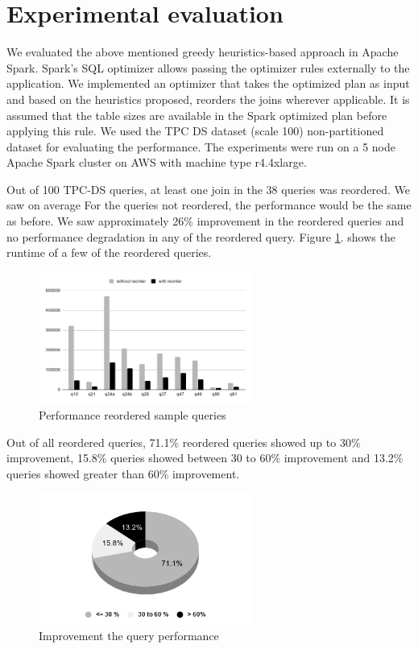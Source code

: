 \section{Experimental evaluation}\label{sec:exp-evaluation}
We evaluated the above mentioned greedy heuristics-based approach in Apache Spark. Spark's SQL optimizer allows passing the optimizer rules externally to the application. We implemented an optimizer that takes the optimized plan as input and based on the heuristics proposed, reorders the joins wherever applicable. It is assumed that the table sizes are available in the Spark optimized plan before applying this rule. We used the TPC DS dataset (scale 100) non-partitioned dataset for evaluating the performance. The experiments were run on a 5 node Apache Spark cluster on AWS with machine type r4.4xlarge.

Out of 100 TPC-DS queries, at least one join in the 38 queries was reordered. We saw on average  For the queries not reordered, the performance would be the same as before. We saw approximately 26\% improvement in the reordered queries and no performance degradation in any of the reordered query. Figure \ref{performance_number}. shows the runtime of a few of the reordered queries.

\begin{figure}[ht]
    \centerline{\includegraphics[width=7cm]{fig/chart.png}}
    \caption{Performance reordered sample queries}
    \label{performance_number}
\end{figure}

Out of all reordered queries, 71.1\% reordered queries showed up to 30\% improvement, 15.8\% queries showed between 30 to 60\% improvement and 13.2\% queries showed greater than 60\% improvement.

\begin{figure}[ht]
\centerline{\includegraphics[width=7cm]{fig/pie.png}}
\caption{Improvement the query performance}
\label{performance_pie_chart}
\end{figure}

